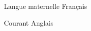 

\begin{cvhonors}

  \cvhonor
    {} %
    {Langue maternelle} %
    {} %
    {Français} %
    
  \cvhonor
    {} %
    {Courant} %
    {} %
    {Anglais} %

  

\end{cvhonors}
